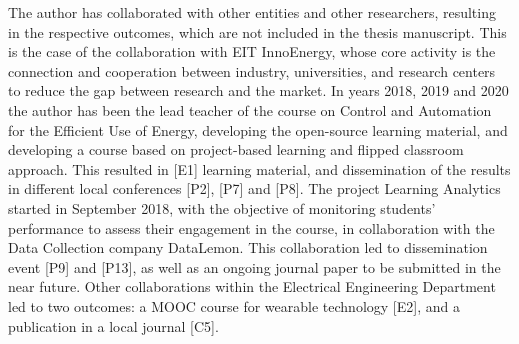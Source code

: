The author has collaborated with other entities and other researchers, resulting in the respective outcomes, which are not included in the thesis manuscript. This is the case of the collaboration with EIT InnoEnergy, whose core activity is the connection and cooperation between industry, universities, and research centers to reduce the gap between research and the market. In years 2018, 2019 and 2020 the author has been the lead teacher of the course on Control and Automation for the Efficient Use of Energy, developing the open-source learning material, and developing a course based on project-based learning and flipped classroom approach. This resulted in [E1] learning material, and dissemination of the results in different local conferences [P2], [P7] and [P8]. The project Learning Analytics started in September 2018, with the objective of monitoring students' performance to assess their engagement in the course, in collaboration with the Data Collection company DataLemon. This collaboration led to dissemination event [P9] and [P13], as well as an ongoing journal paper to be submitted in the near future. Other collaborations within the Electrical Engineering Department led to two outcomes: a MOOC course for wearable technology [E2], and a publication in a local journal [C5]. 


